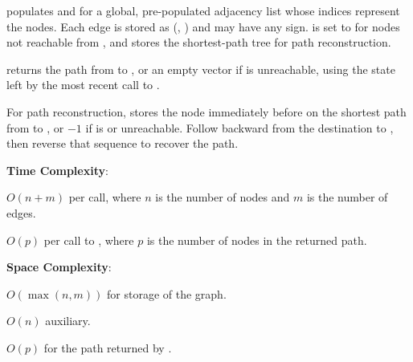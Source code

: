 \begin{compactitem}
  \item {} populates  and  for a global, pre-populated adjacency list  whose indices represent the nodes. Each edge is stored as (, ) and may have any sign.  is set to  for nodes not reachable from , and  stores the shortest-path tree for path reconstruction.
  \item {} returns the path from  to , or an empty vector if  is unreachable, using the state left by the most recent call to .
\end{compactitem}

For path reconstruction,  stores the node immediately before  on the shortest path from  to , or $-1$ if  is  or unreachable. Follow  backward from the destination to , then reverse that sequence to recover the path.

\textbf{Time Complexity}:
\begin{compactitem}
  \item $O(n + m)$ per call, where $n$ is the number of nodes and $m$ is the number of edges.
  \item $O(p)$ per call to , where $p$ is the number of nodes in the returned path.
\end{compactitem}

\textbf{Space Complexity}:
\begin{compactitem}
  \item $O(\max\left(n, m\right))$ for storage of the graph.
  \item $O(n)$ auxiliary.
  \item $O(p)$ for the path returned by .
\end{compactitem}

